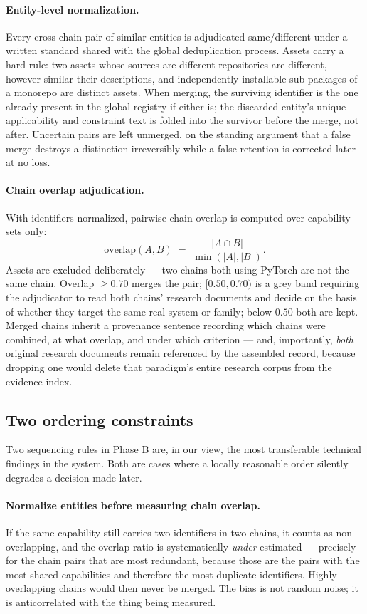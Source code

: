 \documentclass[10pt,a4paper]{article}
\begin{document}
\paragraph{Entity-level normalization.} Every cross-chain pair of similar
entities is adjudicated same/different under a written standard shared with the
global deduplication process. Assets carry a hard rule: two assets whose sources
are different repositories are different, however similar their descriptions, and
independently installable sub-packages of a monorepo are distinct assets. When
merging, the surviving identifier is the one already present in the global
registry if either is; the discarded entity's unique applicability and constraint
text is folded into the survivor before the merge, not after. Uncertain pairs are
left unmerged, on the standing argument that a false merge destroys a distinction
irreversibly while a false retention is corrected later at no loss.

\paragraph{Chain overlap adjudication.} With identifiers normalized, pairwise
chain overlap is computed over capability sets only:
\[
\mathrm{overlap}(A,B) \;=\; \frac{|A \cap B|}{\min(|A|,|B|)} .
\]
Assets are excluded deliberately --- two chains both using PyTorch are not the
same chain. Overlap ${\geq}0.70$ merges the pair; $[0.50, 0.70)$ is a grey band
requiring the adjudicator to read both chains' research documents and decide on
the basis of whether they target the same real system or family; below $0.50$
both are kept. Merged chains inherit a provenance sentence recording which chains
were combined, at what overlap, and under which criterion --- and, importantly,
\emph{both} original research documents remain referenced by the assembled
record, because dropping one would delete that paradigm's entire research corpus
from the evidence index.

\subsection{Two ordering constraints}
\label{sec:order}

Two sequencing rules in Phase B are, in our view, the most transferable technical
findings in the system. Both are cases where a locally reasonable order silently
degrades a decision made later.

\paragraph{Normalize entities before measuring chain overlap.} If the same
capability still carries two identifiers in two chains, it counts as
non-overlapping, and the overlap ratio is systematically \emph{under}-estimated
--- precisely for the chain pairs that are most redundant, because those are the
pairs with the most shared capabilities and therefore the most duplicate
identifiers. Highly overlapping chains would then never be merged. The bias is
not random noise; it is anticorrelated with the thing being measured.
\end{document}
